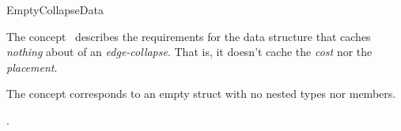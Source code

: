 
\begin{ccRefConcept}{EmptyCollapseData}


\ccDefinition

The concept \ccRefName\ describes the requirements for the data structure that caches {\em nothing} about of an {\em edge-collapse}. That is, it doesn't cache the {\em cost} nor the {\em placement}.

The concept corresponds to an empty struct with no nested types nor members.

\ccRefines
{}

\ccHasModels

.

\end{ccRefConcept}

